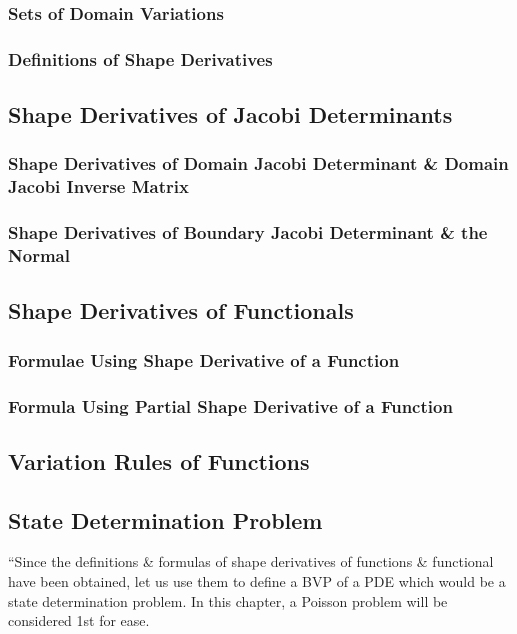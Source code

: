 \documentclass[oneside]{book}
\numberwithin{equation}{section}
\begin{document}
\subsubsection{Sets of Domain Variations}

\subsubsection{Definitions of Shape Derivatives}

\subsection{Shape Derivatives of Jacobi Determinants}

\subsubsection{Shape Derivatives of Domain Jacobi Determinant \& Domain Jacobi Inverse Matrix}

\subsubsection{Shape Derivatives of Boundary Jacobi Determinant \& the Normal}

\subsection{Shape Derivatives of Functionals}

\subsubsection{Formulae Using Shape Derivative of a Function}

\subsubsection{Formula Using Partial Shape Derivative of a Function}

\subsection{Variation Rules of Functions}

\subsection{State Determination Problem}
``Since the definitions \& formulas of shape derivatives of functions \& functional have been obtained, let us use them to define a BVP of a PDE which would be a state determination problem. In this chapter, a Poisson problem will be considered 1st for ease.
\end{document}
